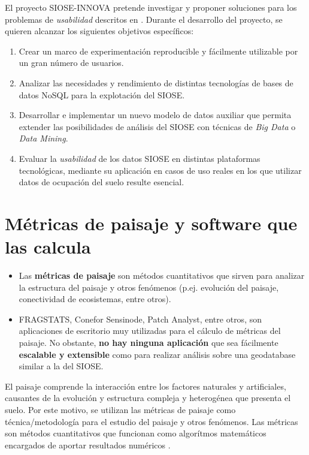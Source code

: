 El proyecto SIOSE-INNOVA pretende investigar y proponer soluciones para los problemas de \textit{usabilidad} descritos en \citet{FernandezVillarino2012}. Durante el desarrollo del proyecto, se quieren alcanzar los siguientes objetivos específicos:
\begin{enumerate}
\item Crear un marco de experimentación reproducible y fácilmente utilizable por un gran número de usuarios.
\item Analizar las necesidades y rendimiento de distintas tecnologías de bases de datos NoSQL para la explotación del SIOSE.
\item Desarrollar e implementar un nuevo modelo de datos auxiliar que permita extender las posibilidades de análisis del SIOSE con técnicas de \textit{Big Data} o \textit{Data Mining}.
\item Evaluar la \textit{usabilidad} de los datos SIOSE en distintas plataformas tecnológicas, mediante su aplicación en casos de uso reales en los que utilizar datos de ocupación del suelo resulte esencial.
\end{enumerate}


\section{Métricas de paisaje y software que las calcula}

\begin{graybox}
\begin{itemize}
\item Las \textbf{métricas de paisaje} son métodos cuantitativos que sirven para analizar la estructura del paisaje y otros fenómenos (p.ej. evolución del paisaje, conectividad de ecosistemas, entre otros).
\item FRAGSTATS, Conefor Sensinode, Patch Analyst, entre otros, son aplicaciones de escritorio muy utilizadas para el cálculo de métricas del paisaje. No obstante, \textbf{no hay ninguna aplicación} que sea fácilmente \textbf{escalable y extensible} como para realizar análisis sobre una geodatabase similar a la del SIOSE.
\end{itemize}
\end{graybox}

El paisaje comprende la interacción entre los factores naturales y artificiales, causantes de la evolución y estructura compleja y heterogénea que presenta el suelo. Por este motivo, se utilizan las métricas de paisaje como técnica/metodología para el estudio del paisaje y otros fenómenos. Las métricas son métodos cuantitativos que funcionan como algorítmos matemáticos encargados de aportar resultados numéricos \cite{Gine2014}.

